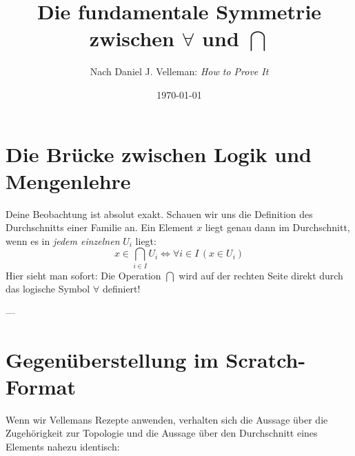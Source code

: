 \documentclass{article}
\title{Die fundamentale Symmetrie zwischen $\forall$ und $\bigcap$}
\author{Nach Daniel J. Velleman: \emph{How to Prove It}}
\date{\today}
\begin{document}
\maketitle

\section*{Die Brücke zwischen Logik und Mengenlehre}

Deine Beobachtung ist absolut exakt. Schauen wir uns die Definition des Durchschnitts einer Familie an. Ein Element $x$ liegt genau dann im Durchschnitt, wenn es in \emph{jedem einzelnen} $U_i$ liegt:
\[
x \in \bigcap_{i \in I} U_i \iff \forall i \in I \, (x \in U_i)
\]
Hier sieht man sofort: Die Operation $\bigcap$ wird auf der rechten Seite direkt durch das logische Symbol $\forall$ definiert!

---

\section*{Gegenüberstellung im Scratch-Format}

Wenn wir Vellemans Rezepte anwenden, verhalten sich die Aussage über die Zugehörigkeit zur Topologie und die Aussage über den Durchschnitt eines Elements nahezu identisch:
\end{document}
